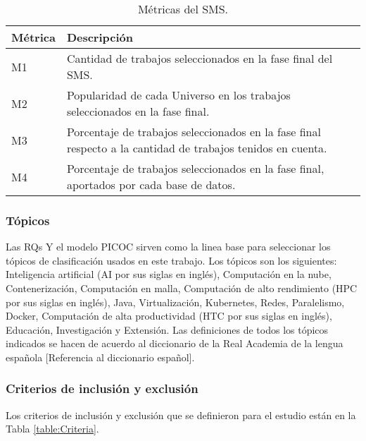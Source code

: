 \begin{table}[htbp]
	
	\centering
	\renewcommand{\arraystretch}{1.7}  %
	\renewcommand{\tablename}{Tabla}  %
	\setlength{\tabcolsep}{3pt}      %
	\vspace{10pt}                     %
	\begin{tabular}{|>{\arraybackslash}m{1cm}|>{\arraybackslash}m{7cm}|}
		\hline	
		\textbf{Métrica} & \textbf{Descripción} \\
		\hline
		M1 & Cantidad de trabajos seleccionados en la fase final del SMS.\\
		\hline
		M2 & Popularidad de cada Universo en los trabajos seleccionados en la fase final.\\
		\hline
		M3 & Porcentaje de trabajos seleccionados en la fase final respecto a la cantidad de trabajos tenidos en cuenta.\\
		\hline
		M4 & Porcentaje de trabajos seleccionados en la fase final, aportados por cada base de datos.\\
		\hline
	\end{tabular}
	\vspace{6pt}  %
	\caption{Métricas del SMS.}
	\label{table:Metrics}
	
\end{table}

\subsubsection{Tópicos}
Las RQs Y el modelo PICOC sirven como la linea base para seleccionar los tópicos de clasificación usados en este trabajo. Los tópicos son los siguientes: Inteligencia artificial (AI por sus siglas en inglés), Computación en la nube, Contenerización, Computación en malla, Computación de alto rendimiento (HPC por sus siglas en inglés), Java, Virtualización, Kubernetes, Redes, Paralelismo, Docker, Computación de alta productividad (HTC por sus siglas en inglés), Educación, Investigación y Extensión. Las definiciones de todos los tópicos indicados se hacen de acuerdo al diccionario de la Real Academia de la lengua española [Referencia al diccionario español].

\subsubsection{Criterios de inclusión y exclusión}
Los criterios de inclusión y exclusión que se definieron para el estudio están en la Tabla \ref{table:Criteria}.

